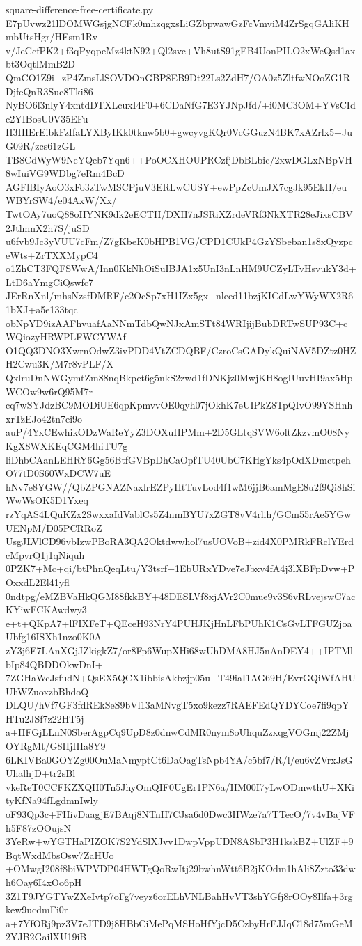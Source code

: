 \documentclass[11pt]{article}
\theoremstyle{definition}
\theoremstyle{remark}
\begin{document}
\begin{filecontents*}[overwrite]{square-difference-free-certificate.py}
E7pUvwz21lDOMWGsjgNCFk0mhzqgxsLiGZbpwawGzFcVmviM4ZrSgqGAliKHmbUtsHgr/HEsm1Rv
v/JeCcfPK2+f3qPyqpeMz4ktN92+Ql2svc+Vh8utS91gEB4UonPILO2xWeQsd1axbt3OqtlMmB2D
QmCO1Z9i+zP4ZmsLlSOVDOnGBP8EB9Dt22Ls2ZdH7/OA0z5ZltfwNOoZG1RDjfeQnR3Suc8Tki86
NyBO6l3nlyY4xntdDTXLcuxI4F0+6CDaNfG7E3YJNpJfd/+i0MC3OM+YVsCIdc2YIBosU0V35EFu
H3HIErEibkFzIfaLYXByIKk0tknw5b0+gwcyvgKQr0VcGGuzN4BK7xAZrlx5+JuG09R/zcs61zGL
TB8CdWyW9NeYQeb7Yqn6++PoOCXHOUPRCzfjDbBLbic/2xwDGLxNBpVH8wIuiVG9WDbg7eRm4BcD
AGFlBIyAoO3xFo3zTwMSCPjuV3ERLwCUSY+ewPpZcUmJX7cgJk95EkH/euWBYrSW4/e04AxW/Xx/
TwtOAy7uoQ88oHYNK9dk2eECTH/DXH7nJSRiXZrdeVRf3NkXTR28eJixsCBV2JtlmnX2h7S/juSD
u6fvb9Jc3yVUU7cFm/Z7gKbeK0bHPB1VG/CPD1CUkP4GzYSbeban1s8xQyzpceWts+ZrTXXMypC4
o1ZhCT3FQFSWwA/Inn0KkNhOiSuIBJA1x5UnI3nLnHM9UCZyLTvHsvukY3d+LtD6aYmgCiQswfc7
JErRnXnl/mhsNzsfDMRF/c2OcSp7xH1IZx5gx+nleed11bzjKICdLwYWyWX2R61bXJ+a5e133tqc
obNpYD9izAAFhvuafAaNNmTdbQwNJxAmSTt84WRIjijBubDRTwSUP93C+cWQiozyHRWPLFWCYWAf
O1QQ3DNO3XwrnOdwZ3ivPDD4VtZCDQBF/CzroCsGADykQuiNAV5DZtz0HZH2Cwu3K/M7r8vPLF/X
QxlruDnNWGymtZm88nqBkpet6g5nkS2zwd1fDNKjz0MwjKH8ogIUuvHI9ax5HpWCOw9w6rQ95M7r
cq7wSYJdzBC9MODiUE6qpKpmvvOE0qyh07jOkhK7eUIPkZ8TpQIvO99YSHnhxrTzEJo42tn7ei9o
auP/4YxCEwhikODzWaReYyZ3DOXuHPMm+2D5GLtqSVW6oltZkzvmO08NyKgX8WXKEqCGM4hiTU7g
liDhbCAanLEHRY6Gg56BtfGVBpDhCaOpfTU40UbC7KHgYks4pOdXDmctpehO77tD0S60WxDCW7uE
hNv7e8YGW//QbZPGNAZNaxlrEZPyIItTuvLod4f1wM6jjB6amMgE8u2f9Qi8hSiWwWsOK5D1Yxeq
rzYqAS4LQuKZx2SwxxaIdVablCs5Z4nmBYU7xZGT8vV4rlih/GCm55rAe5YGwUENpM/D05PCRRoZ
UsgJLVlCD96vbIzwPBoRA3QA2Oktdwwhol7usUOVoB+zid4X0PMRkFRclYErdcMpvrQ1j1qNiquh
0PZK7+Mc+qi/btPhnQeqLtu/Y3tsrf+1EbURxYDve7eJbxv4fA4j3lXBFpDvw+POxxdL2El41yfl
0ndtpg/eMZBVaHkQGM88fkkBY+48DESLVf8xjAVr2C0mue9v3S6vRLvejswC7acKYiwFCKAwdwy3
e+t+QKpA7+lFIXFeT+QEceH93NrY4PUHJKjHnLFbPUhK1CsGvLTFGUZjoaUbfg16ISXh1nzo0K0A
zY3j6E7LAnXGjJZkigkZ7/or8Fp6WupXHi68wUhDMA8HJ5nAnDEY4++IPTMlbIp84QBDDOkwDnI+
7ZGHaWcJsfudN+QsEX5QCX1ibbisAkbzjp05u+T49iaI1AG69H/EvrGQiWfAHUUhWZuoxzbBhdoQ
DLQU/hVf7GF3fdREkSeS9bVl13aMNvgT5xo9kezz7RAEFEdQYDYCoe7fi9qpYHTu2JSf7z22HT5j
a+HFGjLLnN0SberAgpCq9UpD8z0dnwCdMR0nym8oUhquZzxqgVOGmj22ZMjOYRgMt/G8HjIHa8Y9
6LKIVBa0GOYZg00OuMaNmyptCt6DaOagTsNpb4YA/c5bf7/R/l/eu6vZVrxJsGUhalhjD+tr2sBl
vkeReT0CCFKZXQH0Tn5JhyOmQIF0UgEr1PN6a/HM00I7yLwODmwthU+XKityKfNa94fLgdmnIwly
oF93Qp3c+FIIivDaagjE7BAqj8NTnH7CJsa6d0Dwc3HWze7a7TTecO/7v4vBajVFh5F87zOOujsN
3YeRw+wYGTHaPIZOK7S2YdSlXJvv1DwpVppUDN8ASbP3H1kskBZ+UlZF+9BqtWxdMbsOsw7ZaHUo
+OMwgI208f8biWPVDP04HWTgQoRwItj29bwhnWtt6B2jKOdm1hAli8Zzto33dwh6Oay6I4xOo6pH
3Z1T9JYGTYwZXeIvtp7oFg7veyz6orELhVNLBahHvVT3shYGfj8rOOy8Ilfa+3rgkew9ucdmFi0r
a+7YfORj9pz3V7eJTD9j8HBbCiMePqMSHoHfYjcD5CzbyHrFJJqC18d75mGeM2YJB2GailXU19iB

\end{filecontents*}
\end{document}
